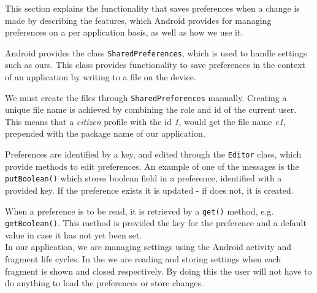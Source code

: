 This section explains the functionality that saves preferences when a change is made by describing the features, which Android provides for managing preferences on a per application basis, as well as how we use it.

Android provides the class \lstinline|SharedPreferences|, which is used to handle settings such as ours.
This class provides functionality to save preferences in the context of an application by writing to a file on the device.

We must create the files through \lstinline|SharedPreferences| manually.
Creating a unique file name is achieved by combining the role and id of the current user.
This means that a \textit{citizen} profile with the id \textit{1}, would get the file name \textit{c1}, prepended with the package name of our application.

Preferences are identified by a key, and edited through the \lstinline|Editor| class, which provide methods to edit preferences.
An example of one of the messages is the \lstinline!putBoolean()! which stores boolean field in a preference, identified with a provided key.
If the preference exists it is updated - if does not, it is created.

When a preference is to be read, it is retrieved by a \lstinline|get()| method, e.g. \lstinline!getBoolean()!.
This method is provided the key for the preference and a default value in case it has not yet been set.\\

In our application, we are managing settings using the Android activity and fragment life cycles.
In the \settingsactivity we are reading and storing settings when each fragment is shown and closed respectively. 
By doing this the user will not have to do anything to load the preferences or store changes.